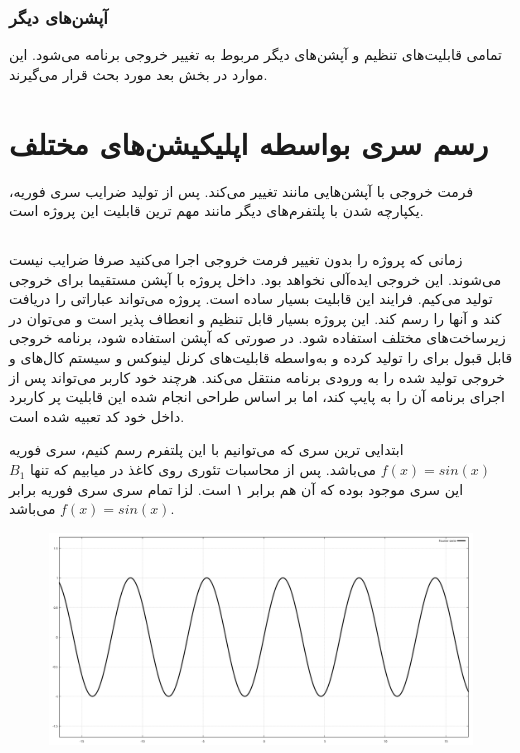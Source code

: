 \documentclass[a4paper]{report}
\begin{document}
\subsubsection{آپشن‌های دیگر}
تمامی قابلیت‌های تنظیم و آپشن‌های دیگر مربوط به تغییر خروجی برنامه می‌شود. این موارد در بخش بعد مورد بحث قرار می‌گیرند.

\section{رسم سری بواسطه اپلیکیشن‌های مختلف}
فرمت خروجی با آپشن‌هایی مانند  تغییر می‌کند. پس از تولید ضرایب سری فوریه، یکپارچه شدن
با پلتفرم‌های دیگر مانند  مهم ترین قابلیت این پروژه است.

\subsection{}
زمانی که پروژه را بدون تغییر فرمت خروجی اجرا می‌کنید صرفا ضرایب نیست می‌شوند. این خروجی ایده‌آلی نخواهد بود.
داخل پروژه با آپشن  مستقیما برای  خروجی تولید می‌کیم. فرایند این قابلیت بسیار ساده است.
پروژه  می‌تواند عباراتی را دریافت کند و آنها را رسم کند. این پروژه بسیار قابل تنظیم و انعطاف پذیر است و
می‌توان در زیرساخت‌های مختلف استفاده شود. در صورتی که آپشن  استفاده شود، برنامه خروجی قابل قبول برای 
را تولید کرده و به‌واسطه قابلیت‌های کرنل لینوکس و سیستم کال‌‌های  و  خروجی تولید شده را به ورودی
برنامه  منتقل می‌کند. هرچند خود کاربر می‌تواند پس از اجرای برنامه آن را به  پایپ کند، اما بر اساس طراحی
انجام شده این قابلیت پر کاربرد داخل خود کد تعبیه شده است.

ابتدایی ترین سری که می‌توانیم با این پلتفرم رسم کنیم، سری فوریه
$f(x) = sin(x)$
می‌باشد. پس از محاسبات تئوری روی کاغذ در میابیم که تنها $B_1$ این سری موجود بوده که آن هم برابر ۱ است.
لزا تمام سری سری فوریه برابر
$f(x) = sin(x)$
می‌باشد.

\begin{figure}[H]
\includegraphics[width=\textwidth]{assets/gnuplot_sinx.png}
\caption*{
}
\end{figure}
\end{document}
